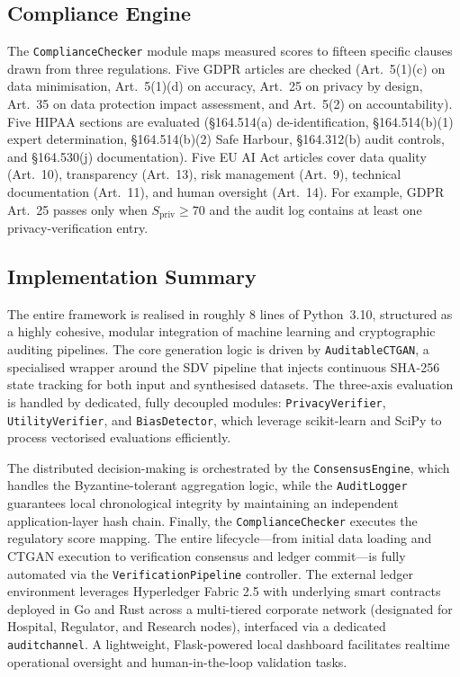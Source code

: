 \subsection{Compliance Engine}

The \texttt{ComplianceChecker} module maps measured scores to fifteen specific clauses drawn from three regulations. Five GDPR articles are checked (Art.~5(1)(c) on data minimisation, Art.~5(1)(d) on accuracy, Art.~25 on privacy by design, Art.~35 on data protection impact assessment, and Art.~5(2) on accountability). Five HIPAA sections are evaluated (\S164.514(a) de-identification, \S164.514(b)(1) expert determination, \S164.514(b)(2) Safe Harbour, \S164.312(b) audit controls, and \S164.530(j) documentation). Five EU AI Act articles cover data quality (Art.~10), transparency (Art.~13), risk management (Art.~9), technical documentation (Art.~11), and human oversight (Art.~14). For example, GDPR Art.~25 passes only when $S_{\mathrm{priv}} \ge 70$ and the audit log contains at least one privacy-verification entry.

\subsection{Implementation Summary}

The entire framework is realised in roughly 8 lines of Python~3.10, structured as a highly cohesive, modular integration of machine learning and cryptographic auditing pipelines. The core generation logic is driven by \texttt{AuditableCTGAN}, a specialised wrapper around the SDV pipeline that injects continuous SHA-256 state tracking for both input and synthesised datasets. The three-axis evaluation is handled by dedicated, fully decoupled modules: \texttt{PrivacyVerifier}, \texttt{UtilityVerifier}, and \texttt{BiasDetector}, which leverage scikit-learn and SciPy to process vectorised evaluations efficiently.

The distributed decision-making is orchestrated by the \texttt{ConsensusEngine}, which handles the Byzantine-tolerant aggregation logic, while the \texttt{AuditLogger} guarantees local chronological integrity by maintaining an independent application-layer hash chain. Finally, the \texttt{ComplianceChecker} executes the regulatory score mapping. The entire lifecycle---from initial data loading and CTGAN execution to verification consensus and ledger commit---is fully automated via the \texttt{VerificationPipeline} controller. The external ledger environment leverages Hyperledger Fabric 2.5 with underlying smart contracts deployed in Go and Rust across a multi-tiered corporate network (designated for Hospital, Regulator, and Research nodes), interfaced via a dedicated \texttt{auditchannel}. A lightweight, Flask-powered local dashboard facilitates realtime operational oversight and human-in-the-loop validation tasks.
